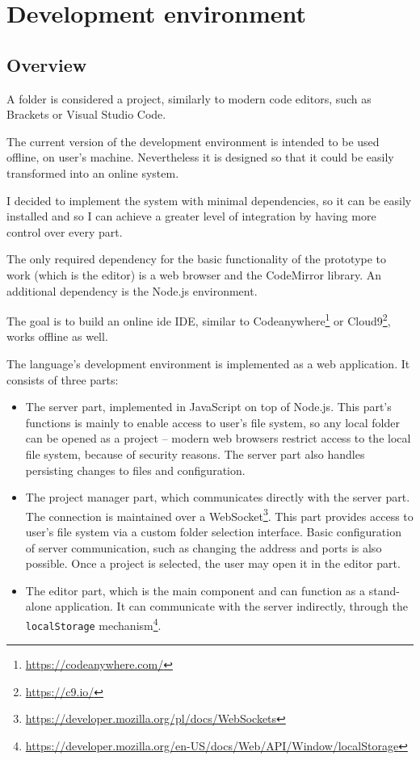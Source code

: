 \chapter{Development environment}\label{chap:editor}

\section{Overview}
A folder is considered a project, similarly to modern code editors, such as Brackets or Visual Studio Code.

The current version of the development environment is intended to be used offline, on user's machine. Nevertheless it is designed so that it could be easily transformed into an online system.

I decided to implement the system with minimal dependencies, so it can be easily installed and so I can achieve a greater level of integration by having more control over every part.

The only required dependency for the basic functionality of the prototype to work (which is the editor) is a web browser and the CodeMirror library. An additional dependency is the Node.js environment.



The goal is to build an online \acrlong{ide} IDE, similar to Codeanywhere\footnote{\url{https://codeanywhere.com/}} or Cloud9\footnote{\url{https://c9.io/}}, works offline as well.

The language's development environment is implemented as a web application. It consists of three parts:
\begin{itemize}
    \item The server part, implemented in JavaScript on top of Node.js. This part's functions is mainly to enable access to user's file system, so any local folder can be opened as a project -- modern web browsers restrict access to the local file system, because of security reasons. The server part also handles persisting changes to files and configuration.
    \item The project manager part, which communicates directly with the server part. The connection is maintained over a WebSocket\footnote{\url{https://developer.mozilla.org/pl/docs/WebSockets}}. This part provides access to user's file system via a custom folder selection interface. Basic configuration of server communication, such as changing the address and ports is also possible. Once a project is selected, the user may open it in the editor part.
    \item The editor part, which is the main component and can function as a stand-alone application. It can communicate with the server indirectly, through the \texttt{localStorage} mechanism\footnote{\url{https://developer.mozilla.org/en-US/docs/Web/API/Window/localStorage}}.
\end{itemize}

